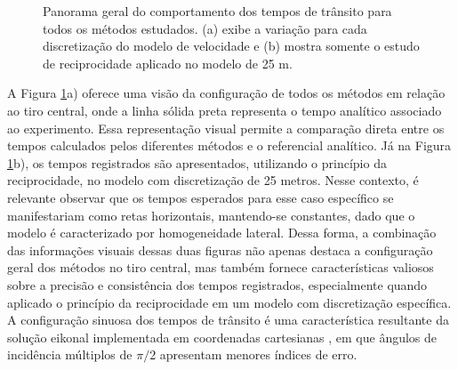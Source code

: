 \begin{figure}[H]
	\centering
	\newline
	\caption{Panorama geral do comportamento dos tempos de trânsito para todos os métodos estudados. (a) exibe a variação para cada discretização do modelo de velocidade e (b) mostra somente o estudo de reciprocidade aplicado no modelo de 25 m.}
	\label{fig:general_refraction_study}	
\end{figure}

A Figura \ref{fig:general_refraction_study}a) oferece uma visão da configuração de todos os métodos em relação ao tiro central, onde a linha sólida preta representa o tempo analítico associado ao experimento. Essa representação visual permite a comparação direta entre os tempos calculados pelos diferentes métodos e o referencial analítico. Já na Figura \ref{fig:general_refraction_study}b), os tempos registrados são apresentados, utilizando o princípio da reciprocidade, no modelo com discretização de 25 metros. Nesse contexto, é relevante observar que os tempos esperados para esse caso específico se manifestariam como retas horizontais, mantendo-se constantes, dado que o modelo é caracterizado por homogeneidade lateral. Dessa forma, a combinação das informações visuais dessas duas figuras não apenas destaca a configuração geral dos métodos no tiro central, mas também fornece características valiosos sobre a precisão e consistência dos tempos registrados, especialmente quando aplicado o princípio da reciprocidade em um modelo com discretização específica. A configuração sinuosa dos tempos de trânsito é uma característica resultante da solução eikonal implementada em coordenadas cartesianas \cite{white2020pykonal}, em que ângulos de incidência múltiplos de $\pi / 2$ apresentam menores índices de erro.    


